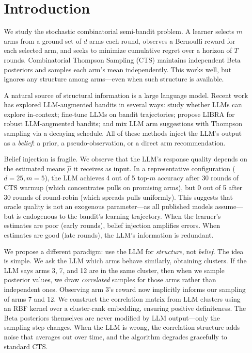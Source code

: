 \documentclass{article}
\theoremstyle{plain}
\theoremstyle{definition}
\theoremstyle{remark}
\begin{document}
\section{Introduction}\label{sec:intro}

We study the stochastic combinatorial semi-bandit problem.
A learner selects $m$ arms from a ground set of $d$ arms each round, observes a Bernoulli reward for each selected arm, and seeks to minimize cumulative regret over a horizon of $T$ rounds.
Combinatorial Thompson Sampling (CTS) \citep{wang2018cts} maintains independent Beta posteriors and samples each arm's mean independently.
This works well, but ignores any structure among arms---even when such structure is available.

A natural source of structural information is a large language model.
Recent work has explored LLM-augmented bandits in several ways:
\citet{krishnamurthy2024canllms} study whether LLMs can explore in-context;
\citet{nie2024evolve} fine-tune LLMs on bandit trajectories;
\citet{cao2026libra} propose LIBRA for robust LLM-augmented bandits;
and \citet{sun2025tsllm} mix LLM arm suggestions with Thompson sampling via a decaying schedule.
All of these methods inject the LLM's output as a \emph{belief}: a prior, a pseudo-observation, or a direct arm recommendation.

Belief injection is fragile. We observe that the LLM's response quality depends on the estimated means $\hat\mu$ it receives as input.
In a representative configuration ($d=25, m=5$), the LLM achieves 4 out of 5 top-$m$ accuracy after 30 rounds of CTS warmup (which concentrates pulls on promising arms), but 0 out of 5 after 30 rounds of round-robin (which spreads pulls uniformly).
This suggests that oracle quality is not an exogenous parameter---as all published models assume---but is endogenous to the bandit's learning trajectory.
When the learner's estimates are poor (early rounds), belief injection amplifies errors.
When estimates are good (late rounds), the LLM's information is redundant.

We propose a different paradigm: use the LLM for \emph{structure}, not \emph{belief}.
The idea is simple.
We ask the LLM which arms behave similarly, obtaining clusters.
If the LLM says arms 3, 7, and 12 are in the same cluster, then when we sample posterior values, we draw \emph{correlated} samples for those arms rather than independent ones.
Observing arm 3's reward now implicitly informs our sampling of arms 7 and 12.
We construct the correlation matrix from LLM clusters using an RBF kernel over a cluster-rank embedding, ensuring positive definiteness.
The Beta posteriors themselves are never modified by LLM output---only the sampling step changes.
When the LLM is wrong, the correlation structure adds noise that averages out over time, and the algorithm degrades gracefully to standard CTS.
\end{document}
